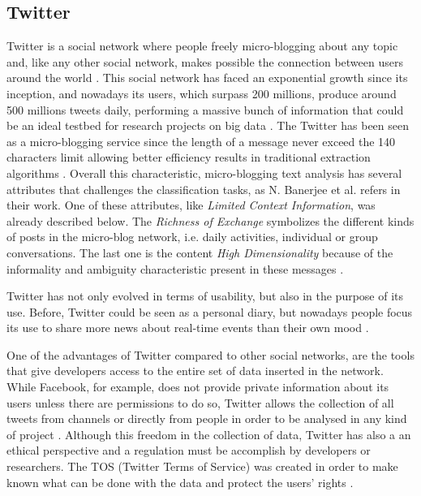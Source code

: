 \subsection{Twitter}
Twitter is a social network where people freely micro-blogging about any topic and, like any other social network, makes possible the connection between users around the world \cite{kn:Sriram2010}. This social network has faced an exponential growth since its inception, and nowadays its users, which surpass 200 millions, produce around 500 millions tweets daily, performing a massive bunch of information that could be an ideal testbed for research projects on big data \cite{kn:Lipizzi2015,kn:Goonetilleke2014}. The Twitter has been seen as a micro-blogging service since the length of a message never exceed the 140 characters limit \cite{kn:Sriram2010} allowing better efficiency results in traditional extraction algorithms \cite{kn:Banerjee2012}. Overall this characteristic, micro-blogging text analysis has several attributes that challenges the classification tasks, as N. Banerjee et al. refers in their work. One of these attributes, like \textit{Limited Context Information}, was already described below. The \textit{Richness of Exchange} symbolizes the different kinds of posts in the micro-blog network, i.e. daily activities, individual or group conversations. The last one is the content \textit{High Dimensionality} because of the informality and ambiguity characteristic present in these messages \cite{kn:Banerjee2012}.

Twitter has not only evolved in terms of usability, but also in the purpose of its use. Before, Twitter could be seen as a personal diary, but nowadays people focus its use to share more news about real-time events than their own mood \cite{kn:Sriram2010}.

One of the advantages of Twitter compared to other social networks, are the tools that give developers access to the entire set of data inserted in the network. While Facebook, for example, does not provide private information about its users unless there are permissions to do so, Twitter allows the collection of all tweets from channels or directly from people in order to be analysed in any kind of project \cite{kn:Musto2015,kn:Stieglitz2013}. Although this freedom in the collection of data, Twitter has also a an ethical perspective and a regulation must be accomplish by developers or researchers. The TOS (Twitter Terms of Service) was created in order to make known what can be done with the data and protect the users' rights \cite{kn:kelley2013}.

